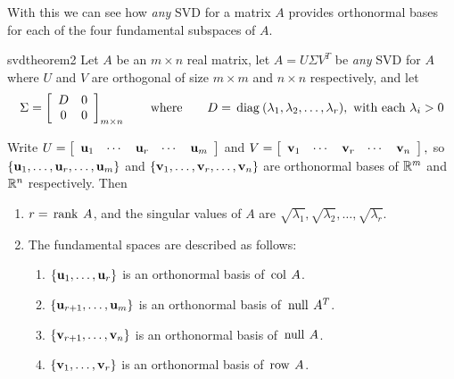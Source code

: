 With this we can see how \emph{any} SVD for a matrix $A$ provides
orthonormal bases for each of the four fundamental subspaces of $A$.

\begin{theorem}{}{svdtheorem2}
Let $A$ be an $m\times n$ real matrix, let $A=U\Sigma V^{T}$ be \emph{any} SVD for $A$ where $U$ and $V$ are orthogonal of size $m\times m$ and $n\times n$ respectively, and let
\begin{equation*} 
\Sigma =
\left[ 
\begin{array}{cc}
D & 0 \\ 
0 & 0
\end{array}
\right]_{m\times n}\qquad  \mbox{where} \qquad D=\thinspace\operatorname{diag\medspace}(\lambda_{1},\lambda_{2},\ldots ,\lambda_{r}), \mbox{ with each } \lambda_{i}>0
\end{equation*}

\noindent Write $U=\left[ \begin{array}{ccccc}\textbf{u}_{1} & \cdots & \textbf{u}_{r} & \cdots & \textbf{u}_{m}\end{array}\right]$ and $V=\left[ \begin{array}{ccccc}\textbf{v}_{1} & \cdots & \textbf{v}_{r} & \cdots & \textbf{v}_{n}\end{array}\right],$ so $\{\textbf{u}_{1},\ldots ,\textbf{u}_{r},\ldots ,\textbf{u}_{m}\}$ and $\{\textbf{v}_{1},\ldots ,\textbf{v}_{r},\ldots ,\textbf{v}_{n}\}$ are orthonormal bases of $\mathbb{R}^{m}$ and $\mathbb{R}^{n}$ respectively. Then
\begin{enumerate}
\item $r=\thinspace\operatorname{rank\medspace}A$, and the singular values of $A$ are $\sqrt{\lambda_{1}},\sqrt{\lambda_{2}},\ldots ,\sqrt{\lambda_{r}}$.

\item The fundamental spaces are described as follows:
\begin{enumerate}[label=\alph*.]
\item $\{\textbf{u}_{1},\ldots ,\textbf{u}_{r}\}$ is an orthonormal basis of $\thinspace\operatorname{col\medspace}A$.

\item $\{\textbf{u}_{r+1},\ldots ,\textbf{u}_{m}\}$ is an
orthonormal basis of $\thinspace\operatorname{null\medspace}A^{T}$.

\item $\{\textbf{v}_{r+1},\ldots ,\textbf{v}_{n}\}$ is an
orthonormal basis of $\thinspace\operatorname{null\medspace}A$.

\item $\{\textbf{v}_{1},\ldots ,\textbf{v}_{r}\}$ is an
orthonormal basis of $\thinspace\operatorname{row\medspace}A$.
\end{enumerate}
\end{enumerate}
\end{theorem}

